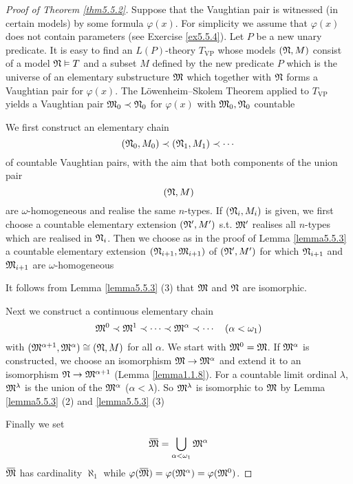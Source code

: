 \documentclass[11pt]{article}
\begin{document}
\begin{proof}[Proof of Theorem \ref{thm5.5.2}]
Suppose that the Vaughtian pair is witnessed (in certain models) by some formula \(\varphi(x)\). For
simplicity we assume that \(\varphi(x)\) does not contain parameters (see Exercise \ref{ex5.5.4}).
Let \(P\) be a new unary predicate. It is easy to find an \(L(P)\)-theory \(T_{\text{VP}}\) whose
models \((\mathfrak{N},M)\) consist of a model \(\mathfrak{N}\vDash T\) and a subset \(M\) defined by the new
predicate \(P\) which is the universe of an elementary substructure \(\mathfrak{M}\) which together
with \(\mathfrak{N}\) forms a Vaughtian pair for \(\varphi(x)\).
The Löwenheim–Skolem Theorem applied to \(T_{\text{VP}}\) yields a Vaughtian pair \(\mathfrak{M}_0\prec\mathfrak{N}_0\)
for \(\varphi(x)\) with \(\mathfrak{M}_0,\mathfrak{N}_0\)  countable

We first construct an elementary chain
\begin{equation*}
(\mathfrak{N}_0,M_0)\prec(\mathfrak{N}_1,M_1)\prec\cdots
\end{equation*}
of countable Vaughtian pairs, with the aim that both components of the union pair
\begin{equation*}
(\mathfrak{N},M)
\end{equation*}
are \(\omega\)-homogeneous and realise the same \(n\)-types. If \((\mathfrak{N}_i,M_i)\) is given, we first choose a
countable elementary extension \((\mathfrak{N}',M')\) s.t. \(\mathfrak{M}'\) realises all \(n\)-types which are
realised in \(\mathfrak{N}_i\).
Then we choose as in the proof of Lemma
\ref{lemma5.5.3} a countable elementary extension \((\mathfrak{N}_{i+1},\mathfrak{M}_{i+1})\) of \((\mathfrak{N}',M')\) for
which \(\mathfrak{N}_{i+1}\) and \(\mathfrak{M}_{i+1}\) are \(\omega\)-homogeneous

It follows from Lemma \ref{lemma5.5.3} (3) that \(\mathfrak{M}\) and \(\mathfrak{N}\) are isomorphic.

Next we construct a continuous elementary chain
\begin{equation*}
\mathfrak{M}^0\prec\mathfrak{M}^1\prec\cdots\prec\mathfrak{M}^\alpha\prec\cdots\quad(\alpha<\omega_1)
\end{equation*}
with \((\mathfrak{M}^{\alpha+1},\mathfrak{M}^\alpha)\cong(\mathfrak{N},M)\) for all \(\alpha\). We start with \(\mathfrak{M}^0=\mathfrak{M}\). If \(\mathfrak{M}^\alpha\) is constructed, we
choose an isomorphism \(\mathfrak{M}\to\mathfrak{M}^\alpha\) and extend it to an isomorphism \(\mathfrak{N}\to\mathfrak{M}^{\alpha+1}\) (Lemma
\ref{lemma1.1.8}). For a countable limit ordinal \(\lambda\), \(\mathfrak{M}^\lambda\) is the union of the \(\mathfrak{M}^\alpha\) (\(\alpha<\lambda\)).
So \(\mathfrak{M}^\lambda\) is isomorphic to \(\mathfrak{M}\) by Lemma \ref{lemma5.5.3} (2) and \ref{lemma5.5.3} (3)

Finally we set
\begin{equation*}
\barfM=\bigcup_{\alpha<\omega_1}\fM^\alpha
\end{equation*}
\(\barfM\) has cardinality \(\aleph_1\) while \(\varphi(\barfM)=\varphi(\fM^\alpha)=\varphi(\fM^0)\).
\end{proof}
\end{document}
